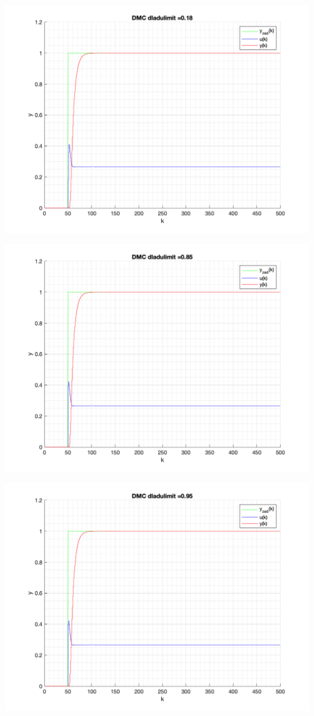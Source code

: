 \documentclass[a4paper, 11pt]{article}
\begin{document}
\begin{enumerate}
 \includegraphics[width=\linewidth]{./ModelsP6_dulimit/P4_DMC_dulimit_0_18_png.png} 
 
 \includegraphics[width=\linewidth]{./ModelsP6_dulimit/P4_DMC_dulimit_0_85_png.png} 
 
 \includegraphics[width=\linewidth]{./ModelsP6_dulimit/P4_DMC_dulimit_0_95_png.png} 
 

\end{enumerate}
\end{document}
